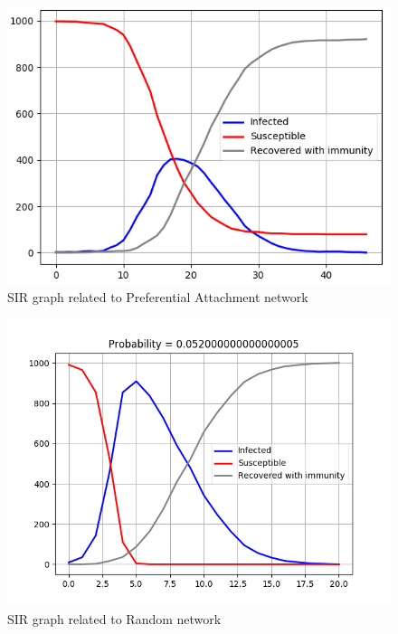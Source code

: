     \begin{figure}[t]
        \centering
        \includegraphics[width=\linewidth]{Figure/SIR_graph_PrefAttach.png}
        \caption{SIR graph related to Preferential Attachment network}
        \label{fig:PrefAttachSIR}
    \end{figure}
    
    \begin{figure}[t]
        \centering
        \includegraphics[width=\linewidth]{Figure/SIR_graph_Random.png}
        \caption{SIR graph related to Random network}
        \label{fig:RandomSIR}
    \end{figure}